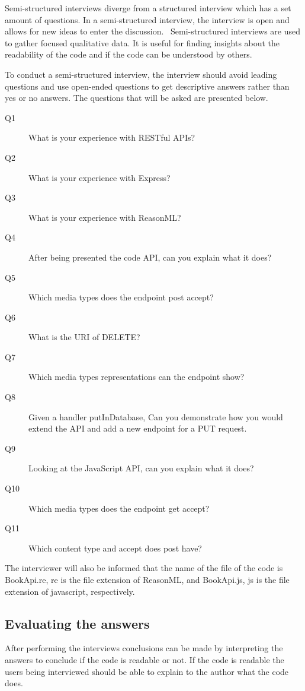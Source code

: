 Semi-structured interviews diverge from a structured interview which has a set
amount of questions. In a semi-structured interview, the interview is open and
allows for new ideas to enter the discussion.~\cite{longhurst2003semi}
Semi-structured interviews are used to gather focused qualitative data. It is
useful for finding insights about the readability of the code and if the code
can be understood by others.

To conduct a semi-structured interview, the interview should avoid leading
questions and use open-ended questions to get descriptive answers rather than
yes or no answers. The questions that will be asked are presented below.

\begin{description}
    \item[Q1] What is your experience with RESTful APIs?
    \item[Q2] What is your experience with Express?
    \item[Q3] What is your experience with ReasonML?
    \item[Q4] After being presented the code API, can you explain what it does?
    \item[Q5] Which media types does the endpoint post accept?
    \item[Q6] What is the URI of DELETE?
    \item[Q7] Which media types representations can the endpoint show?
    \item[Q8] Given a handler putInDatabase, Can you demonstrate how you would
        extend the API and add a new endpoint for a PUT request.
    \item[Q9] Looking at the JavaScript API, can you explain what it does?
    \item[Q10] Which media types does the endpoint get accept?
    \item[Q11] Which content type and accept does post have?
\end{description}

The interviewer will also be informed that the name of the file of the code is
BookApi.re, re is the file extension of ReasonML, and BookApi.js, js is the file
extension of javascript, respectively. 

\subsection{Evaluating the answers}

After performing the interviews conclusions can be made by interpreting the
answers to conclude if the code is readable or not. If the code is readable the
users being interviewed should be able to explain to the author what the code
does.

